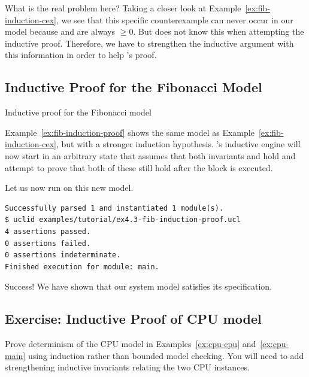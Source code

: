 What is the real problem here? Taking a closer look at Example~\ref{ex:fib-induction-cex}, we see that this specific counterexample can never occur in our model because  and  are always $\ge 0$. But \uclid{} does not know this when attempting the inductive proof. Therefore, we have to strengthen the inductive argument with this information in order to help \uclid{}'s proof.

\subsection{Inductive Proof for the Fibonacci Model}

\begin{uclidlisting}[htbp]
    
    \caption{Inductive proof for the Fibonacci model}
    \label{ex:fib-induction-proof}
\end{uclidlisting}

Example~\ref{ex:fib-induction-proof} shows the same model as Example~\ref{ex:fib-induction-cex}, but with a stronger induction hypothesis. \uclid{}'s inductive engine will now start in an arbitrary state that assumes that both invariants  and  hold and attempt to prove that both of these still hold after the  block is executed.

Let us now run \uclid{} on this new model.

\begin{Verbatim}[frame=single, samepage=true]
Successfully parsed 1 and instantiated 1 module(s).
$ uclid examples/tutorial/ex4.3-fib-induction-proof.ucl 
4 assertions passed.
0 assertions failed.
0 assertions indeterminate.
Finished execution for module: main.
\end{Verbatim}

Success! We have shown that our system model satisfies its specification.

\subsection{Exercise: Inductive Proof of CPU model}
Prove determinism of the CPU model in Examples~\ref{ex:cpu-cpu} 
and~\ref{ex:cpu-main} using induction rather than bounded model 
checking. You will need to add strengthening inductive invariants relating the two CPU instances.

